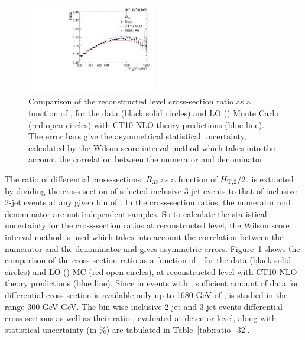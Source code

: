 \begin{figure}[!h] 
 \begin{center}
 \hspace*{-5mm}\includegraphics[width=0.5\textwidth]{Plots_HT_2_150/Ratio_32_all_HT_2_150.pdf}
 \caption[Comparison of the cross-section ratio for the data with simulated events and CT10-NLO theory predictions.]{Comparison of the reconstructed level cross-section ratio \ratio as a function of \httwons, for the data (black solid circles) and LO \MadGraphFn\plusn \PYTHIAS (\MGP) Monte Carlo (red open circles) with CT10-NLO theory predictions (blue line). The error bars give the asymmetrical statistical uncertainty, calculated by the Wilson score interval method which takes into the account the correlation between the numerator and denominator.}
 \label{fig:ratio_32}
 \end{center}
\end{figure}

The ratio of differential cross-sections, $R_{32}$ as a function of $H_{\mathrm{T,2}}/2$, is extracted by dividing the cross-section of selected inclusive 3-jet events to that of inclusive 2-jet events at any given bin of \httwo. In the cross-section ratios, the numerator and denominator are not independent samples. So to calculate the statistical uncertainty for the cross-section ratios at reconstructed level, the Wilson score interval method is used which takes into account the correlation between the numerator and the denominator and gives asymmetric errors. Figure~\ref{fig:ratio_32} shows the comparison of the cross-section ratio \ratio as a function of \httwons, for the data (black solid circles) and LO \MadGraphFn\plusn \PYTHIAS (\MGP) MC (red open circles), at reconstructed level with CT10-NLO theory predictions (blue line). Since in events with \njth, sufficient amount of data for differential cross-section is available only up to 1680 GeV of \httwo, \ratio is studied in the range 300 GeV \ls \httwo {} GeV. The bin-wise inclusive 2-jet and 3-jet events differential cross-sections as well as their ratio \rations, evaluated at detector level, along with statistical uncertainty (in \%) are tabulated in Table~\ref{tab:ratio_32}. 


